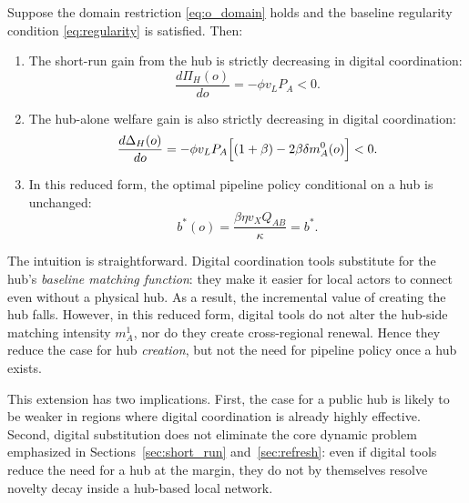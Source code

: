 \begin{proposition}
\label{prop:online_substitution}
Suppose the domain restriction \eqref{eq:o_domain} holds and the baseline regularity condition \eqref{eq:regularity} is satisfied. Then:

\begin{enumerate}[leftmargin=2em]
    \item The short-run gain from the hub is strictly decreasing in digital coordination:
    \begin{equation}
    \frac{d\Pi_H(o)}{do}
    =
    -\phi v_LP_A
    <0.
    \label{eq:dPiH_do}
    \end{equation}

    \item The hub-alone welfare gain is also strictly decreasing in digital coordination:
    \begin{equation}
    \frac{d\Delta_H(o)}{do}
    =
    -\phi v_LP_A\Bigl[(1+\beta)-2\beta\delta m_A^0(o)\Bigr]
    <0.
    \label{eq:dDeltaH_do}
    \end{equation}

    \item In this reduced form, the optimal pipeline policy conditional on a hub is unchanged:
    \begin{equation}
    b^*(o)=\frac{\beta\eta v_XQ_{AB}}{\kappa}=b^*.
    \label{eq:bstar_online}
    \end{equation}
\end{enumerate}
\end{proposition}

The intuition is straightforward. Digital coordination tools substitute for the hub's \emph{baseline matching function}: they make it easier for local actors to connect even without a physical hub. As a result, the incremental value of creating the hub falls. However, in this reduced form, digital tools do not alter the hub-side matching intensity $m_A^1$, nor do they create cross-regional renewal. Hence they reduce the case for hub \emph{creation}, but not the need for pipeline policy once a hub exists.

This extension has two implications. First, the case for a public hub is likely to be weaker in regions where digital coordination is already highly effective. Second, digital substitution does not eliminate the core dynamic problem emphasized in Sections~\ref{sec:short_run} and~\ref{sec:refresh}: even if digital tools reduce the need for a hub at the margin, they do not by themselves resolve novelty decay inside a hub-based local network.

